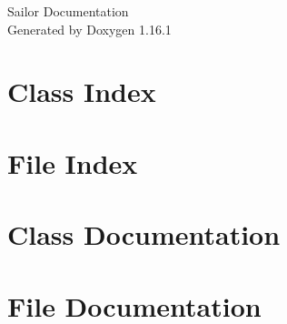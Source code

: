 \documentclass[twoside]{book}
\newcommand{\+}{\discretionary{\mbox{\scriptsize$\hookleftarrow$}}{}{}}
\newcommand{\clearemptydoublepage}{%
    \newpage{\pagestyle{empty}\cleardoublepage}%
  }
\begin{document}
  \raggedbottom
    \hypersetup{pageanchor=false,
                bookmarksnumbered=true,
                pdfencoding=unicode
               }
  \begin{titlepage}
  \vspace*{7cm}
  \begin{center}%
  {\Large Sailor Documentation}\\
  \vspace*{1cm}
  {\large Generated by Doxygen 1.16.1}\\
  \end{center}
  \end{titlepage}
  \clearemptydoublepage
  \tableofcontents
  \clearemptydoublepage
  \hypersetup{pageanchor=true}

\chapter{Class Index}

\chapter{File Index}

\chapter{Class Documentation}

\chapter{File Documentation}









  \backmatter
  \newpage
  \clearemptydoublepage
  \printindex
\end{document}
